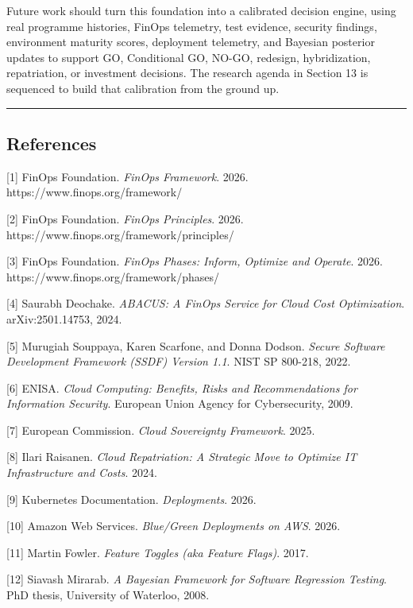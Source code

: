 \documentclass[
]{article}
\begin{document}
Future work should turn this foundation into a calibrated decision
engine, using real programme histories, FinOps telemetry, test evidence,
security findings, environment maturity scores, deployment telemetry,
and Bayesian posterior updates to support GO, Conditional GO, NO-GO,
redesign, hybridization, repatriation, or investment decisions. The
research agenda in Section 13 is sequenced to build that calibration
from the ground up.

\begin{center}\rule{0.5\linewidth}{0.5pt}\end{center}

\subsection{References}\label{references}

{[}1{]} FinOps Foundation. \emph{FinOps Framework}. 2026.
https://www.finops.org/framework/

{[}2{]} FinOps Foundation. \emph{FinOps Principles}. 2026.
https://www.finops.org/framework/principles/

{[}3{]} FinOps Foundation. \emph{FinOps Phases: Inform, Optimize and
Operate}. 2026. https://www.finops.org/framework/phases/

{[}4{]} Saurabh Deochake. \emph{ABACUS: A FinOps Service for Cloud Cost
Optimization}. arXiv:2501.14753, 2024.

{[}5{]} Murugiah Souppaya, Karen Scarfone, and Donna Dodson.
\emph{Secure Software Development Framework (SSDF) Version 1.1}. NIST SP
800-218, 2022.

{[}6{]} ENISA. \emph{Cloud Computing: Benefits, Risks and
Recommendations for Information Security}. European Union Agency for
Cybersecurity, 2009.

{[}7{]} European Commission. \emph{Cloud Sovereignty Framework}. 2025.

{[}8{]} Ilari Raisanen. \emph{Cloud Repatriation: A Strategic Move to
Optimize IT Infrastructure and Costs}. 2024.

{[}9{]} Kubernetes Documentation. \emph{Deployments}. 2026.

{[}10{]} Amazon Web Services. \emph{Blue/Green Deployments on AWS}.
2026.

{[}11{]} Martin Fowler. \emph{Feature Toggles (aka Feature Flags)}.
2017.

{[}12{]} Siavash Mirarab. \emph{A Bayesian Framework for Software
Regression Testing}. PhD thesis, University of Waterloo, 2008.
\end{document}
